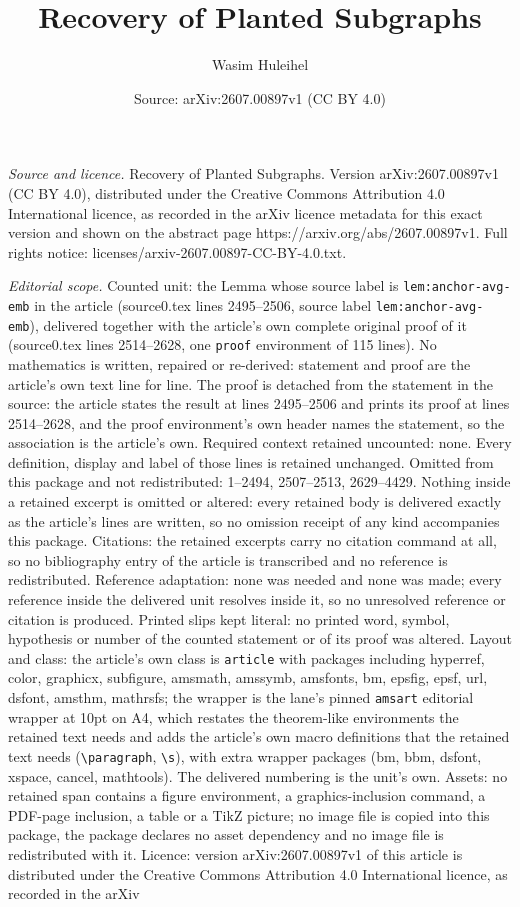 \documentclass[10pt,a4paper]{amsart}
\title[Recovery of Planted Subgraphs]{Recovery of Planted Subgraphs}
\author{Wasim Huleihel}
\date{Source: arXiv:2607.00897v1 (CC BY 4.0)}
\begin{document}
\maketitle

\noindent\emph{Source and licence.} Recovery of Planted Subgraphs. Version arXiv:2607.00897v1 (CC BY 4.0), distributed under the Creative Commons Attribution 4.0 International licence, as recorded in the arXiv licence metadata for this exact version and shown on the abstract page https://arxiv.org/abs/2607.00897v1. Full rights notice: licenses/arxiv-2607.00897-CC-BY-4.0.txt.\par\smallskip

\noindent\textit{Editorial scope.} Counted unit: the Lemma whose source label is \texttt{lem:anchor-avg-emb} in the article (source0.tex lines 2495--2506, source label \texttt{lem:anchor-avg-emb}), delivered together with the article's own complete original proof of it (source0.tex lines 2514--2628, one \texttt{proof} environment of 115 lines). No mathematics is written, repaired or re-derived: statement and proof are the article's own text line for line. The proof is detached from the statement in the source: the article states the result at lines 2495--2506 and prints its proof at lines 2514--2628, and the proof environment's own header names the statement, so the association is the article's own. Required context retained uncounted: none. Every definition, display and label of those lines is retained unchanged. Omitted from this package and not redistributed: 1--2494, 2507--2513, 2629--4429. Nothing inside a retained excerpt is omitted or altered: every retained body is delivered exactly as the article's lines are written, so no omission receipt of any kind accompanies this package. Citations: the retained excerpts carry no citation command at all, so no bibliography entry of the article is transcribed and no reference is redistributed. Reference adaptation: none was needed and none was made; every reference inside the delivered unit resolves inside it, so no unresolved reference or citation is produced. Printed slips kept literal: no printed word, symbol, hypothesis or number of the counted statement or of its proof was altered. Layout and class: the article's own class is \texttt{article} with packages including hyperref, color, graphicx, subfigure, amsmath, amssymb, amsfonts, bm, epsfig, epsf, url, dsfont, amsthm, mathrsfs; the wrapper is the lane's pinned \texttt{amsart} editorial wrapper at 10pt on A4, which restates the theorem-like environments the retained text needs and adds the article's own macro definitions that the retained text needs (\texttt{\textbackslash paragraph}, \texttt{\textbackslash s}), with extra wrapper packages (bm, bbm, dsfont, xspace, cancel, mathtools). The delivered numbering is the unit's own. Assets: no retained span contains a figure environment, a graphics-inclusion command, a PDF-page inclusion, a table or a TikZ picture; no image file is copied into this package, the package declares no asset dependency and no image file is redistributed with it. Licence: version arXiv:2607.00897v1 of this article is distributed under the Creative Commons Attribution 4.0 International licence, as recorded in the arXiv 
\end{document}
